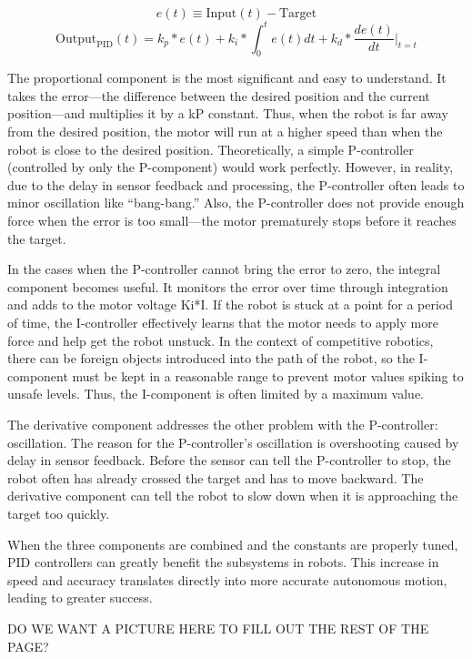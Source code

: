 \[ e(t) \equiv \text{Input}(t) - \text{Target} \]
\[ \text{Output}_{\text{PID}}(t) = k_p * e(t) + k_i * \int_0^t{e(t)dt} + k_d * \frac{de(t)}{dt}|_{t=t} \]

The proportional component is the most significant and easy to understand. It takes the error—the difference between the desired position and the current position—and multiplies it by a kP constant. Thus, when the robot is far away from the desired position, the motor will run at a higher speed than when the robot is close to the desired position. Theoretically, a simple P-controller (controlled by only the P-component) would work perfectly. However, in reality, due to the delay in sensor feedback and processing, the P-controller often leads to minor oscillation like “bang-bang.” Also, the P-controller does not provide enough force when the error is too small—the motor prematurely stops before it reaches the target.

In the cases when the P-controller cannot bring the error to zero, the integral component becomes useful. It monitors the error over time through integration and adds to the motor voltage Ki*I. If the robot is stuck at a point for a period of time, the I-controller effectively learns that the motor needs to apply more force and help get the robot unstuck. In the context of competitive robotics, there can be foreign objects introduced into the path of the robot, so the I-component must be kept in a reasonable range to prevent motor values spiking to unsafe levels. Thus, the I-component is often limited by a maximum value.

The derivative component addresses the other problem with the P-controller: oscillation. The reason for the P-controller’s oscillation is overshooting caused by delay in sensor feedback. Before the sensor can tell the P-controller to stop, the robot often has already crossed the target and has to move backward. The derivative component can tell the robot to slow down when it is approaching the target too quickly.

When the three components are combined and the constants are properly tuned, PID controllers can greatly benefit the subsystems in robots. This increase in speed and accuracy translates directly into more accurate autonomous motion, leading to greater success.

\begin{center}
    DO WE WANT A PICTURE HERE TO FILL OUT THE REST OF THE PAGE?
\end{center}
